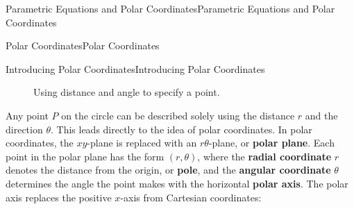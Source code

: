 \documentclass[10pt,]{book}
\newcommand{\terminology}[1]{\textbf{#1}}
\numberwithin{equation}{section}
\begin{document}
\begin{chapterptx}{Parametric Equations and Polar Coordinates}{}{Parametric Equations and Polar Coordinates}{}{}
\begin{sectionptx}{Polar Coordinates}{}{Polar Coordinates}{}{}
\begin{subsectionptx}{Introducing Polar Coordinates}{}{Introducing Polar Coordinates}{}{}
\begin{figure}
{
}
\caption{Using distance and angle to specify a point.\label{figure-polar-coords}}
\end{figure}
\hypertarget{p-799}{}%
Any point \(P\) on the circle can be described solely using the distance \(r\) and the direction \(\theta\). This leads directly to the idea of polar coordinates. In polar coordinates, the \(xy\)-plane is replaced with an \(r\theta\)-plane, or \terminology{polar plane}. Each point in the polar plane has the form \((r,\theta)\), where the \terminology{radial coordinate} \(r\) denotes the distance from the origin, or \terminology{pole}, and the \terminology{angular coordinate} \(\theta\) determines the angle the point makes with the horizontal \terminology{polar axis}. The polar axis replaces the positive \(x\)-axis from Cartesian coordinates:%
\begin{figure}
\centering
{
        }
\end{figure}
\end{subsectionptx}
\end{sectionptx}
\end{chapterptx}
\end{document}
